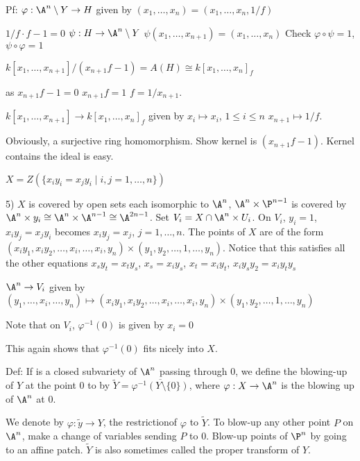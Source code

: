 Pf: $\varphi: \A^n \setminus Y \to H$ given by $(x_1,\ldots,x_n)= (x_1,\ldots,x_n,1/f)$

$1/f \cdot f-1=0$
$\psi: H \to \A^n \setminus Y$
$\psi(x_1,\ldots,x_{n+1})= (x_1,\ldots,x_n)$
Check $\varphi \circ \psi= 1$, $\psi \circ \varphi= 1$

$k[x_1,\ldots,x_{n+1}]/(x_{n+1}f-1) = A(H) \cong k[x_1,\ldots,x_n]_f$

as 
$x_{n+1}f-1=0$
$x_{n+1}f=1$
$f= 1/x_{n+1}$. 


$k[x_1,\ldots,x_{n+1}] \to k[x_1,\ldots,x_n]_f$
given by $x_i \mapsto x_i$, $1 \leq i \leq n$
$x_{n+1} \mapsto 1/f$.

Obviously, a surjective ring homomorphism. Show kernel is $(x_{n+1}f-1)$. Kernel contains the ideal is easy. 











$X= Z(\{x_iy_i= x_jy_i \;|\; i,j= 1,\ldots,n\})$

5) $X$ is covered by open sets each isomorphic to $\A^n$, $\A^n \times \P^{n-1}$ is covered by $\A^n \times y_i \cong \A^n \times \A^{n-1} \cong \A^{2n-1}$. Set $V_i = X \cap \A^n \times U_i$. On $V_i$, $y_i= 1$, $x_iy_j= x_jy_i$ becomes $x_iy_j= x_j$, $j=1,\ldots,n$. The points of $X$ are of the form
$(x_iy_1,x_iy_2,\ldots,x_i,\ldots,x_i,y_n) \times (y_1,y_2,\ldots,1,\ldots,y_n)$. Notice that this satisfies all the other equations $x_sy_t= x_ty_s$, $x_s= x_iy_s$, $x_t= x_iy_t$, $x_iy_sy_2=x_iy_ty_s$

$\A^n \to V_i$ given by $(y_1,\ldots,x_i,\ldots,y_n) \mapsto (x_iy_1,x_iy_2,\ldots,x_i,\ldots,x_i,y_n) \times (y_1,y_2,\ldots,1,\ldots,y_n)$

Note that on $V_i$, $\varphi^{-1}(0)$ is given by $x_i= 0$


This again shows that $\varphi^{-1}(0)$ fits nicely into $X$. 




Def: If is a closed subvariety of $\A^n$ passing through 0, we define the blowing-up of $Y$ at the point 0 to by $\tilde{Y} = \overline{\varphi^{-1}(Y \setminus \{0\})}$, where $\varphi: X \to \A^n$ is the blowing up of $\A^n$ at 0.


We denote by $\varphi: \tilde{y} \to Y$, the restrictionof $\varphi$ to $\tilde{Y}$. To blow-up any other point $P$ on $\A^n$, make a change of variables sending $P$ to 0. Blow-up points of $\P^n$ by going to an affine patch. $\tilde{Y}$ is also sometimes called the proper transform of $Y$. 


